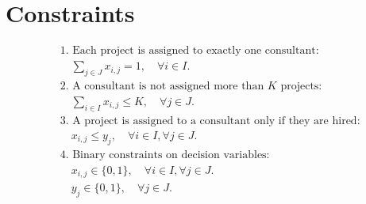 \documentclass{article}
\begin{document}
\section*{Constraints}
\begin{align*}
    & \text{1. Each project is assigned to exactly one consultant:} \\
    & \quad \sum_{j \in J} x_{i,j} = 1, \quad \forall i \in I. \\
    & \text{2. A consultant is not assigned more than } K \text{ projects:} \\
    & \quad \sum_{i \in I} x_{i,j} \leq K, \quad \forall j \in J. \\
    & \text{3. A project is assigned to a consultant only if they are hired:} \\
    & \quad x_{i,j} \leq y_j, \quad \forall i \in I, \forall j \in J. \\
    & \text{4. Binary constraints on decision variables:} \\
    & \quad x_{i,j} \in \{0, 1\}, \quad \forall i \in I, \forall j \in J. \\
    & \quad y_j \in \{0, 1\}, \quad \forall j \in J.
\end{align*}
\end{document}
